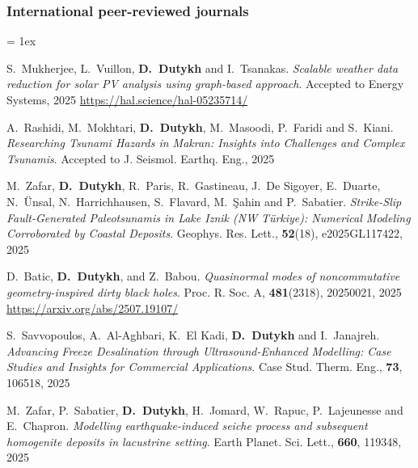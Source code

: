 \separator
\subsubsection{International peer-reviewed journals}

\listpartsep = 1ex

\begin{etaremune}

  

  \item S.~Mukherjee, L.~Vuillon, \textbf{D.~Dutykh} and I.~Tsanakas. \textit{Scalable weather data reduction for solar PV analysis using graph-based approach}. Accepted to Energy Systems, 2025 %
  \url{https://hal.science/hal-05235714/}

  \item A.~Rashidi, M.~Mokhtari, \textbf{D.~Dutykh}, M.~Masoodi, P.~Faridi and S.~Kiani. \textit{Researching Tsunami Hazards in Makran: Insights into Challenges and Complex Tsunamis}. Accepted to J. Seismol. Earthq. Eng., 2025 %
  
  \item M.~Zafar, \textbf{D.~Dutykh}, R.~Paris, R.~Gastineau, J.~De Sigoyer, E.~Duarte, N.~\"Unsal, N.~Harrichhausen, S.~Flavard, M.~\c{S}ahin and P.~Sabatier. \textit{Strike-Slip Fault-Generated Paleotsunamis in Lake Iznik (NW T\"{u}rkiye): Numerical Modeling Corroborated by Coastal Deposits}. Geophys. Res. Lett., \textbf{52}(18), e2025GL117422, 2025 %

  \item D.~Batic, \textbf{D.~Dutykh}, and Z.~Babou. \textit{Quasinormal modes of noncommutative geometry-inspired dirty black holes}. Proc. R. Soc. A, \textbf{481}(2318), 20250021, 2025 \\ %
  \url{https://arxiv.org/abs/2507.19107/}

  \item S.~Savvopoulos, A.~Al-Aghbari, K.~El Kadi, \textbf{D.~Dutykh} and I.~Janajreh. \textit{Advancing Freeze Desalination through Ultrasound-Enhanced Modelling: Case Studies and Insights for Commercial Applications}. Case Stud. Therm. Eng., \textbf{73}, 106518, 2025 %

  \item M.~Zafar, P.~Sabatier, \textbf{D.~Dutykh}, H.~Jomard, W.~Rapuc, P.~Lajeunesse and E.~Chapron. \textit{Modelling earthquake-induced seiche process and subsequent homogenite deposits in lacustrine setting}. Earth Planet. Sci. Lett., \textbf{660}, 119348, 2025 %


\end{etaremune}
